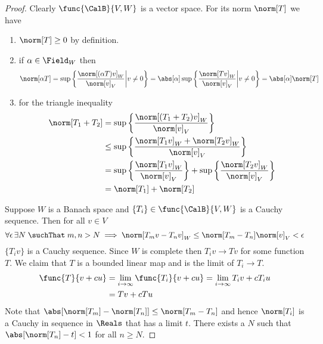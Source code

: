 \begin{proof}
    Clearly \(\func{\CalB}{V,W}\) is a vector space. For its norm \(\norm[T]\) we have
    \begin{enumerate}
        \item \(\norm[T] \geq 0\) by definition.
        \item if \(\alpha \in \Field_W\) then
              \begin{equation*}
                  \norm[\alpha T] = \sup \left\{ \dfrac{\norm[(\alpha T)v]_W}{\norm[v]_V} \middle| v \neq 0 \right\} = \abs[\alpha] \sup \left\{ \dfrac{\norm[Tv]_W}{\norm[v]_V} \middle| v \neq 0 \right\} = \abs[\alpha] \norm[T]
              \end{equation*}
        \item for the triangle inequality
              \begin{align*}
                  \norm[T_1 + T_2] & = \sup \left\{ \dfrac{\norm[(T_1 + T_2)v]_W}{\norm[v]_V} \right\}                                                     \\
                                   & \leq \sup \left\{ \dfrac{\norm[T_1v]_W + \norm[T_2v]_W}{\norm[v]_V} \right\}                                          \\
                                   & = \sup \left\{ \dfrac{\norm[T_1v]_W}{\norm[v]_V} \right\} + \sup \left\{ \dfrac{\norm[ T_2 v]_W}{\norm[v]_V} \right\} \\
                                   & = \norm[T_1] + \norm[T_2]
              \end{align*}
    \end{enumerate}
    Suppose \(W\) is a Banach space and \(\{T_i\} \in \func{\CalB}{V,W}\) is a Cauchy sequence. Then for all \(v \in V\)
    \begin{equation*}
        \forall \epsilon \, \exists N \; \suchThat \; m,n > N \implies \norm[T_m v - T_n v]_W \leq \norm[T_m - T_n]\norm[v]_V < \epsilon
    \end{equation*}
    \(\{T_i v\}\) is a Cauchy sequence. Since \(W\) is complete then \(T_i v \to Tv\) for some function \(T\). We claim that \(T\) is a bounded linear map and is the limit of \(T_i \to T\).
    \begin{align*}
        \func{T}{v + cu} & = \lim_{i \to \infty} \func{T_i}{v + cu} = \lim_{i \to \infty} T_i v + c T_i u \\
                         & = Tv + c Tu
    \end{align*}
    Note that  \( \abs[{\norm[T_m] - \norm[T_n]}] \leq \norm[T_m - T_n]\) and hence \(\norm[T_i]\) is a Cauchy in sequence in \(\Reals\) that has a limit \(t\). There exists a \(N\) such that \(\abs[{\norm[T_n] - t}] < 1\) for all \(n \geq N\).

\end{proof}
